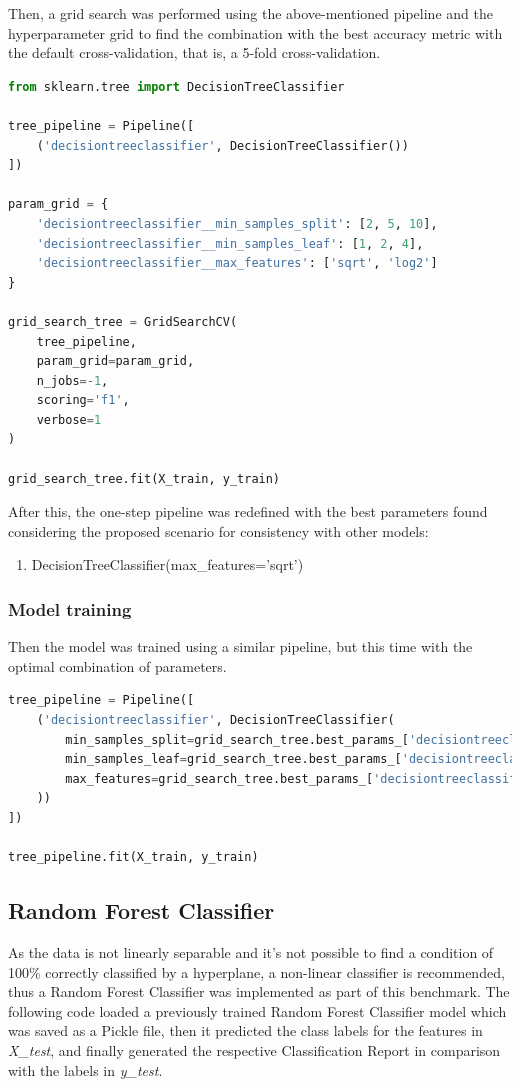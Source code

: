 \documentclass{article}
\begin{document}
Then, a grid search was performed using the above-mentioned pipeline and the hyperparameter grid to find the combination with the best accuracy metric with the default cross-validation, that is, a 5-fold cross-validation.
\begin{lstlisting}[language=Python]
from sklearn.tree import DecisionTreeClassifier

tree_pipeline = Pipeline([
    ('decisiontreeclassifier', DecisionTreeClassifier())
])

param_grid = {
    'decisiontreeclassifier__min_samples_split': [2, 5, 10],
    'decisiontreeclassifier__min_samples_leaf': [1, 2, 4],
    'decisiontreeclassifier__max_features': ['sqrt', 'log2']
}

grid_search_tree = GridSearchCV(
    tree_pipeline,
    param_grid=param_grid,
    n_jobs=-1,
    scoring='f1',
    verbose=1
)

grid_search_tree.fit(X_train, y_train)
\end{lstlisting}

After this, the one-step pipeline was redefined with the best parameters found considering the proposed scenario for consistency with other models:
\begin{enumerate}    
    \item DecisionTreeClassifier(max\_features='sqrt')
\end{enumerate}

\subsubsection{Model training}
Then the model was trained using a similar pipeline, but this time with the optimal combination of parameters.

\begin{lstlisting}[language=Python]
tree_pipeline = Pipeline([
    ('decisiontreeclassifier', DecisionTreeClassifier(
        min_samples_split=grid_search_tree.best_params_['decisiontreeclassifier__min_samples_split'],
        min_samples_leaf=grid_search_tree.best_params_['decisiontreeclassifier__min_samples_leaf'],
        max_features=grid_search_tree.best_params_['decisiontreeclassifier__max_features']
    ))
])

tree_pipeline.fit(X_train, y_train)
\end{lstlisting}

\subsection{Random Forest Classifier} 
As the data is not linearly separable and it's not possible to find a condition of 100\% correctly classified by a hyperplane, a non-linear classifier is recommended, thus a Random Forest Classifier was implemented as part of this benchmark. The following code loaded a previously trained Random Forest Classifier model which was saved as a Pickle file, then it predicted the class labels for the features in \emph{X\_test}, and finally generated the respective Classification Report in comparison with the labels in \emph{y\_test}.
\end{document}
